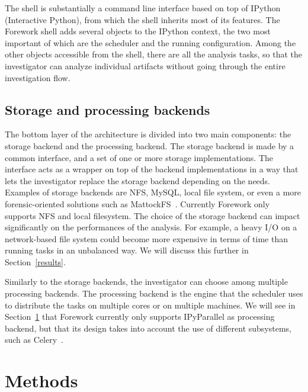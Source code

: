 \documentclass[twoside]{article}
\begin{document}
\begin{multicols}{2}
The shell is substantially a command line interface based on top of
IPython~\cite{ipython} (Interactive Python), from which the shell inherits most
of its features. The Forework shell adds several objects to the IPython context,
the two most important of which are the scheduler and the running configuration.
Among the other objects accessible from the shell, there are all the analysis
tasks, so that the investigator can analyze individual artifacts without going
through the entire investigation flow.

\subsection*{Storage and processing backends}

The bottom layer of the architecture is divided into two main components: the
storage backend and the processing backend.
The storage backend is made by a common interface, and a set of one or more
storage implementations. The interface acts as a wrapper on top of the backend
implementations in a way that lets the investigator replace the storage backend
depending on the needs.
Examples of storage backends are NFS, MySQL, local file system, or even a more
forensic-oriented solutions such as MattockFS~\cite{mattockfs}. Currently
Forework only supports NFS and local filesystem. The choice of
the storage backend can impact significantly on the performances of the
analysis. For example, a heavy I/O on a network-based file system could become
more expensive in terms of time than running tasks in an unbalanced way.
We will discuss this further in Section~\ref{results}.

Similarly to the storage backends, the investigator can choose among multiple
processing backends. The processing backend is the engine that the scheduler
uses to distribute the tasks on multiple cores or on multiple machines. We will
see in Section~\ref{methods} that Forework currently only supports IPyParallel
as processing backend, but that its design takes into account the use of
different subsystems, such as Celery~\cite{celery}.

\section{Methods}
\label{methods}


\end{multicols}
\end{document}
